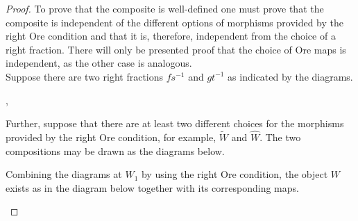    \begin{proof}
        To prove that the composite is well-defined one must prove that the composite is independent of the different options of morphisms provided by the right Ore condition and that it is, therefore, independent from the choice of a right fraction. There will only be presented proof that the choice of Ore maps is independent, as the other case is analogous. \\

        Suppose there are two right fractions $fs^{-1}$ and $gt^{-1}$ as indicated by the diagrams.

        \begin{center}
            , 
        \end{center}
        Further, suppose that there are at least two different choices for the morphisms provided by the right Ore condition, for example, $\widetilde{W}$ and $\widehat{W}$. The two compositions may be drawn as the diagrams below.
        \begin{center}
        \end{center}
        Combining the diagrams at $W_1$ by using the right Ore condition, the object $W$ exists as in the diagram below together with its corresponding maps. 
        \begin{center}
\end{center}
\end{proof}
